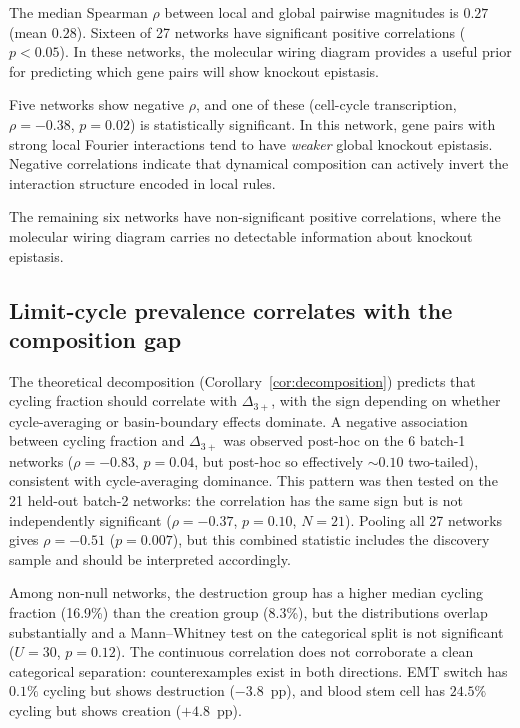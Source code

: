 \documentclass[10pt]{article}
\begin{document}
The median Spearman $\rho$ between local and global pairwise
magnitudes is $0.27$ (mean $0.28$). Sixteen of 27 networks have
significant positive correlations ($p < 0.05$). In these networks,
the molecular wiring diagram provides a useful prior for predicting
which gene pairs will show knockout epistasis.

Five networks show negative $\rho$, and one of these
(cell-cycle transcription, $\rho = -0.38$, $p = 0.02$) is
statistically significant. In this network, gene pairs with strong
local Fourier interactions tend to have \emph{weaker} global knockout
epistasis. Negative correlations indicate that dynamical composition
can actively invert the interaction structure encoded in local rules.

The remaining six networks have non-significant positive
correlations, where the molecular wiring diagram carries no detectable
information about knockout epistasis.


\subsection{Limit-cycle prevalence correlates with the composition gap}
\label{sec:cycling}

The theoretical decomposition (Corollary~\ref{cor:decomposition})
predicts that cycling fraction should correlate with $\Delta_{3+}$,
with the sign depending on whether cycle-averaging or basin-boundary
effects dominate. A negative association between cycling fraction and $\Delta_{3+}$ was
observed post-hoc on the 6 batch-1 networks ($\rho = -0.83$,
$p = 0.04$, but post-hoc so effectively $\sim 0.10$ two-tailed),
consistent with cycle-averaging dominance.
This pattern was then tested on the 21 held-out batch-2 networks:
the correlation has the same sign but is not independently
significant ($\rho = -0.37$, $p = 0.10$, $N = 21$). Pooling all 27
networks gives $\rho = -0.51$ ($p = 0.007$), but this combined
statistic includes the discovery sample and should be interpreted
accordingly.

Among non-null networks, the destruction group has a higher median
cycling fraction (16.9\%) than the creation group (8.3\%), but the
distributions overlap substantially and a Mann--Whitney test on the
categorical split is not significant ($U = 30$, $p = 0.12$). The
continuous correlation does not corroborate a clean categorical
separation: counterexamples exist in both directions. EMT switch has
$0.1\%$ cycling but shows destruction ($-3.8$~pp), and blood stem
cell has $24.5\%$ cycling but shows creation ($+4.8$~pp).
\end{document}

